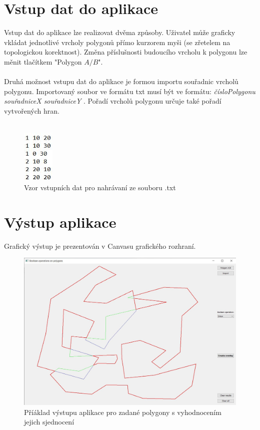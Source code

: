 \documentclass[a4paper, 12pt]{article}
\begin{document}
\newpage

\section{Vstup dat do aplikace}
Vstup dat do aplikace lze realizovat dvěma způsoby. Uživatel může graficky vkládat jednotlivé vrcholy polygonů přímo kurzorem myši (se zřetelem na topologickou korektnost). Změna příslušnosti budoucího vrcholu k polygonu lze měnit tlačítkem "Polygon $A/B$".\\
\\
Druhá možnost vstupu dat do aplikace je formou importu souřadnic vrcholů polygonu. Importovaný soubor ve formátu txt musí být ve formátu: \textit{čísloPolygonu souřadniceX souřadniceY} . Pořadí vrcholů polygonu určuje také pořadí vytvořených hran.\\
\\
 
\begin{figure}[h!]
	\centering
	\includegraphics[width=1.5cm]{data.jpg}
	\caption{Vzor vstupních dat pro nahrávaní ze souboru .txt}
\end{figure}

\section{Výstup aplikace}
Grafický výstup je prezentován v Canvasu grafického rozhraní.

\begin{figure}[h!]
	\centering
	\includegraphics[width=12cm]{vystup.jpg}
	\caption{Příáklad výstupu aplikace pro zadané polygony s vyhodnocením jejich sjednocení}
\end{figure}
\end{document}
